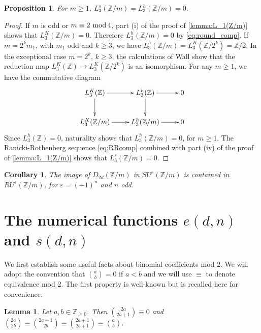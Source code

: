\documentclass[11pt,a4paper,leqno]{amsart}
\newtheorem{proposition}[theorem]{Proposition}
\newtheorem{lemma}[theorem]{Lemma}
\newtheorem{corollary}[theorem]{Corollary}
\theoremstyle{definition}
\theoremstyle{remark}
\newcommand{\cy}[1]{\Z/{#1}}
\newcommand{\Z}{\mathbb{Z}}
\renewcommand{\mod}{\,\,\text{\normalfont mod}\,}
\newcommand{\bZ}{\mathbb Z}
\newcommand{\ep}{\varepsilon}
\newcommand{\SU}{SU^{\varepsilon}}
\newcommand{\RU}{RU^{\varepsilon}}
\begin{document}
\begin{proposition}\label{prop:except} For $m \geq 1$, 
$L_3^s(\cy m) = L_3^h(\cy m) = 0$.
\end{proposition}
\begin{proof} If $m$ is odd or $m \equiv 2 \mod 4$,  part (i) of the proof of \cref{lemma:L_1(Z/m)} shows that $L_3^K(\cy m) = 0$. Therefore $L_3^h(\cy m) = 0$ by \eqref{eq:round_comp}. If $m = 2^k m_1$, with $m_1$ odd and $k \geq 3$, we have $L_3^h(\cy m) = L_3^K(\cy{2^k}) = \cy 2$. 
 In the exceptional case $m = 2^k$, $k \geq 3$, the calculations of Wall \cite[\S 1]{Wall:1976} show that the reduction map $L^K_3(\bZ) \to L^K_3(\cy{2^k})$ is an isomorphism. 
For any $m \geq 1$, we have the commutative diagram
$$\xymatrix{L^K_3(\bZ) \ar[r]\ar[d]&L_3^h(\bZ)\ar[d]\ar[r]& 0\\
L^K_3(\cy m) \ar[r]&L_3^h(\cy m)\ar[r] &0
}$$
Since $L_3^h(\bZ) = 0$, naturality shows that $L_3^h(\cy m) = 0$, for $m \geq 1$. 
The Ranicki-Rothenberg sequence \eqref{eq:RRcomp} combined with part (iv) of the proof of \cref{lemma:L_1(Z/m)}  shows that $L_3^s(\cy m) = 0$. 
\end{proof}

\begin{corollary}\label{cor:exceptcor}
The image of  $D_{2d}(\Z/m)$ in $\SU(\cy m)$ is contained in  $ \RU(\cy m)$, for $\ep = (-1)^n$ and $n$ odd.
\end{corollary}

\section{The numerical functions $e(d,n)$ and $s(d,n)$} \label{s:funct}

We first establish some useful facts about binomial coefficients mod $2$.
We will adopt the convention that $\binom{a}{b}=0$ if $a < b$ and we will use $\equiv$ to denote equivalence mod $2$.
The first property is well-known but is recalled here for convenience.

\begin{lemma} \label{lemma:mod2-useful}
Let $a,b \in \Z_{\ge 0}$. Then $\binom{2a}{2b+1} \equiv 0$
and $\binom{2a}{2b} \equiv \binom{2a+1}{2b} \equiv \binom{2a+1}{2b+1} \equiv \binom{a}{b}$.
\end{lemma}
\end{document}
